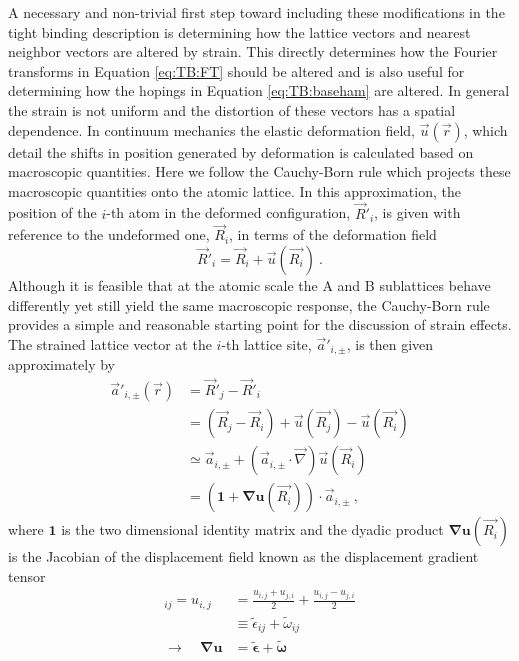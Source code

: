 A necessary and non-trivial first step toward including these modifications in the tight binding description is determining how the lattice vectors and nearest neighbor vectors are altered by strain.
This directly determines how the Fourier transforms in Equation \ref{eq:TB:FT} should be altered and is also useful for determining how the hopings in Equation \ref{eq:TB:baseham} are altered.
In general the strain is not uniform and the distortion of these vectors has a spatial dependence.
In continuum mechanics the elastic deformation field, $\vec{u}(\vec{r})$, which detail the shifts in position generated by  deformation is calculated based on macroscopic quantities.
Here we follow the Cauchy-Born rule which projects these macroscopic quantities onto the atomic lattice.
In this approximation, the position of the $i$-th atom in the deformed configuration, $\vec{R}'_i$, is given with reference to the undeformed one, $\vec{R}_i$, in terms of the deformation field
\begin{equation*}
  \vec{R}'_{i}=\vec{R}_{i}+\vec{u}(\vec{R_i}) \ .
\end{equation*}
Although it is feasible that at the atomic scale the A and B sublattices behave differently yet still yield the same macroscopic response, the Cauchy-Born rule provides a simple and reasonable starting point for the discussion of strain effects.
The strained lattice vector at the $i$-th lattice site, $\vec{a}'_{i,\pm}$, is then given approximately by
\begin{align}
  \vec{a}'_{i,\pm}(\vec{r})&=\vec{R}'_j-\vec{R}'_i \nonumber\\
                              &=(\vec{R}_j-\vec{R}_i)+\vec{u}(\vec{R_j})-\vec{u}(\vec{R_i}) \nonumber \\
                              &\simeq\vec{a}_{i,\pm}+(\vec{a}_{i,\pm} \cdot \vec{\nabla}) \vec{u}(\vec{R}_i) \nonumber \\
                              &=\left(\bm{1}+\bm{\nabla u}(\vec{R_i}) \right)\cdot \vec{a}_{i,\pm} \label{eq:PVP:StrainVectors} \ ,
\end{align}
where $\bm{1}$ is the two dimensional identity matrix and the dyadic product $\bm{\nabla u}(\vec{R_i})$ is the Jacobian of the displacement field known as the displacement gradient tensor
\begin{align*}
  [\bm{\nabla u}]_{ij} = u_{i,j} &= \frac{u_{i,j}+u_{j,i}}{2} + \frac{u_{i,j}-u_{j,i}}{2} \\
                       &\equiv \tilde{\epsilon}_{ij} + \tilde{\omega}_{ij} \\
    \rightarrow \quad \bm{\nabla u} &= \tilde{\bm{\epsilon}} + \tilde{\bm{\omega}}
\end{align*}
